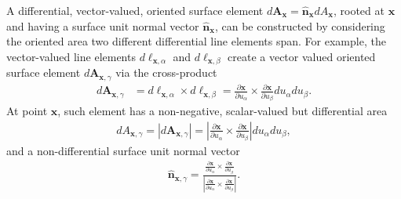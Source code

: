 A differential, vector-valued, oriented surface element $d\bm{A}_{\bm{x}}=\bm{\hat{n}}_{\bm{x}}dA_{\bm{x}}$, rooted at $\bm{x}$ and having a surface unit normal vector $\bm{\hat{n}}_{\bm{x}}$, can be constructed by considering the oriented area two different differential line elements span. For example, the vector-valued line elements $d\bm{\ell}_{\bm{x},\alpha}$ and $d\bm{\ell}_{\bm{x},\beta}$ create a vector valued oriented surface element $d\bm{A}_{\bm{x},\gamma}$ via the cross-product
\begin{align}
    d\bm{A}_{\bm{x},\gamma}&=d\bm{\ell}_{\bm{x},\alpha}\times d\bm{\ell}_{\bm{x},\beta}=\frac{\partial \bm{x}}{\partial u_\alpha}\times\frac{\partial \bm{x}}{\partial u_\beta}du_\alpha du_\beta.
\end{align}
At point $\bm{x}$, such element has a non-negative, scalar-valued but differential area
\begin{align}
    dA_{\bm{x},\gamma}=\left|d\bm{A}_{\bm{x},\gamma}\right|=\left|\frac{\partial \bm{x}}{\partial u_\alpha}\times\frac{\partial \bm{x}}{\partial u_\beta}\right|du_\alpha du_\beta,
\end{align}
and a non-differential surface unit normal vector
\begin{align}
    \bm{\hat{n}}_{\bm{x},\gamma}=\frac{\frac{\partial \bm{x}}{\partial u_\alpha}\times\frac{\partial \bm{x}}{\partial u_\beta}}{\left|\frac{\partial \bm{x}}{\partial u_\alpha}\times\frac{\partial \bm{x}}{\partial u_\beta}\right|}.
\end{align}

